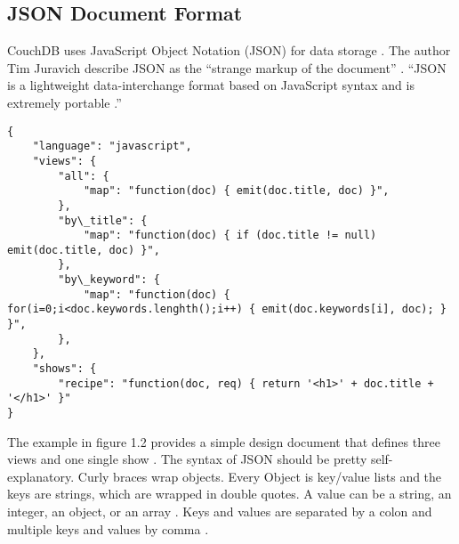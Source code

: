 \subsection{JSON Document Format}
CouchDB uses JavaScript Object Notation (JSON) for data storage \cite{Anderson.2010.Buch}.
The author Tim Juravich describe JSON as the ``strange markup of the document'' \cite{Juravich2012}. ``JSON is a lightweight data-interchange format based on JavaScript syntax and is extremely portable \cite{Juravich2012}.''
\newpage
\begin{lstlisting}[frame=single, caption=Example JSON Document based on \protect\cite{Brown.2012}]
{
    "language": "javascript",
    "views": {
        "all": {
            "map": "function(doc) { emit(doc.title, doc) }",
        },
        "by\_title": {
            "map": "function(doc) { if (doc.title != null) emit(doc.title, doc) }",
        },
        "by\_keyword": {
            "map": "function(doc) { for(i=0;i<doc.keywords.lenghth();i++) { emit(doc.keywords[i], doc); } }",
        },
    },
    "shows": {
        "recipe": "function(doc, req) { return '<h1>' + doc.title + '</h1>' }"
}
\end{lstlisting}
The example in figure 1.2 provides a simple design document that defines three views and one single show \cite{Brown.2012}. The syntax of JSON should be pretty self-explanatory. Curly braces wrap objects. Every Object is key/value lists and the keys are strings, which are wrapped in double quotes. A value can be a string, an integer, an object, or an array \cite{CouchDB.Guide}. Keys and values are separated by a colon and multiple keys and values by comma \cite{CouchDB.Guide}. \\

